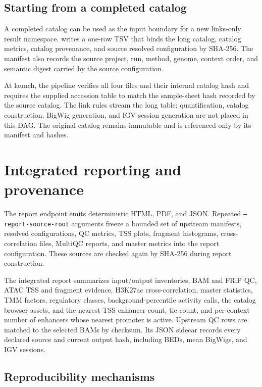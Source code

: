 \documentclass[11pt]{article}
\newcommand{\filep}[1]{\path{#1}}
\begin{document}
\subsection{Starting from a completed catalog}

A completed catalog can be used as the input boundary for a new links-only
result namespace.  \filep{src/create_catalog_manifest.py} writes a one-row TSV
that binds the long catalog, catalog metrics, catalog provenance, and source
resolved configuration by SHA-256.  The manifest also records the source
project, run, method, genome, context order, and semantic digest carried by the
source configuration.

At launch, the pipeline verifies all four files and their internal catalog hash
and requires the supplied accession table to match the sample-sheet hash
recorded by the source catalog.  The link rules stream the long table;
quantification, catalog construction, BigWig generation, and IGV-session
generation are not placed in this DAG.  The original catalog remains immutable
and is referenced only by its manifest and hashes.

\section{Integrated reporting and provenance}

The report endpoint emits deterministic HTML, PDF, and JSON.  Repeated
\texttt{--report-source-root} arguments freeze a bounded set of upstream
manifests, resolved configurations, QC metrics, TSS plots, fragment
histograms, cross-correlation files, MultiQC reports, and master metrics into
the report configuration.  These sources are checked again by SHA-256 during
report construction.

The integrated report summarizes input/output inventories, BAM and FRiP QC,
ATAC TSS and fragment evidence, H3K27ac cross-correlation, master statistics,
TMM factors, regulatory classes, background-percentile activity calls, the
catalog browser assets, and the nearest-TSS enhancer count, tie count, and
per-context number of enhancers whose nearest promoter is active.  Upstream QC
rows are matched to the selected BAMs by checksum.  Its JSON sidecar records
every declared source and current output hash, including BEDs, mean BigWigs,
and IGV sessions.

\subsection{Reproducibility mechanisms}
\end{document}
